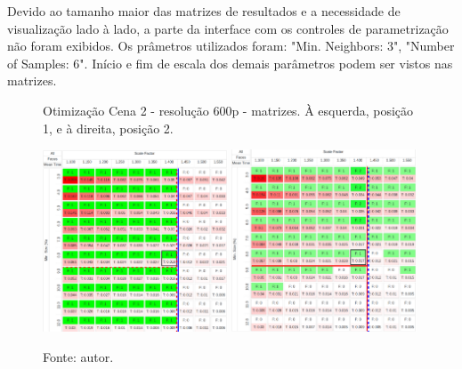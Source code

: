Devido ao tamanho maior das matrizes de resultados e a necessidade de visualização lado à lado, a parte da interface com os controles de parametrização não foram exibidos. Os prâmetros utilizados foram: "Min. Neighbors: 3", "Number of Samples: 6". Início e fim de escala dos demais parâmetros podem ser vistos nas matrizes.



\begin{figure}[H]
    \centering
    \caption[Otimização Cena 2 - resolução 600p - matrizes. À esquerda posição 1 e à direita, posição 2]{Otimização Cena 2 - resolução 600p - matrizes. À esquerda, posição 1, e à direita, posição 2.}
    \includegraphics[width=0.49\textwidth]{Cap4_Experimentos_Realizados/Figures/cena2_800x600_pos1_matriz.jpg}
    \includegraphics[width=0.49\textwidth]{Cap4_Experimentos_Realizados/Figures/cena2_800x600_pos2_matriz.jpg}
    \caption*{Fonte: autor.}
    \label{fig:otimizacaoCena2_600p_matrizes}
\end{figure}

